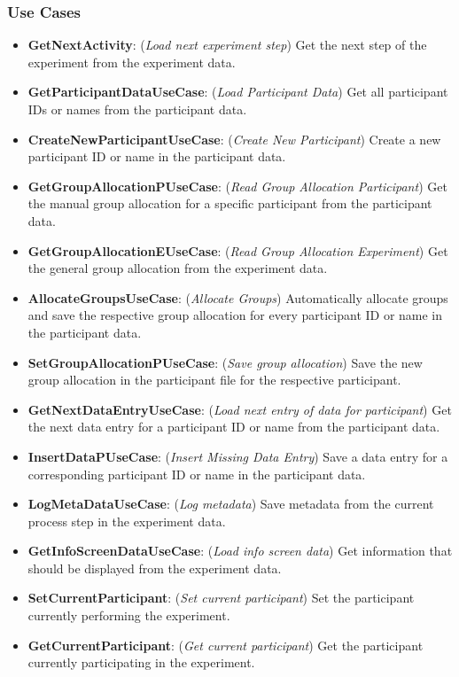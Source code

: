 \begin{spacing}{0.5}

\subsubsection*{Use Cases}
\begin{itemize}
    \item \textbf{GetNextActivity}: (\textit{Load next experiment step}) Get the next step of the experiment from the experiment data.
    \item \textbf{GetParticipantDataUseCase}: (\textit{Load Participant Data}) Get all participant IDs or names from the participant data. 
    \item \textbf{CreateNewParticipantUseCase}: (\textit{Create New Participant}) Create a new participant ID or name in the participant data.
    \item \textbf{GetGroupAllocationPUseCase}: (\textit{Read Group Allocation Participant}) Get the manual group allocation for a specific participant from the participant data.
    \item \textbf{GetGroupAllocationEUseCase}: (\textit{Read Group Allocation Experiment}) Get the general group allocation from the experiment data.
    \item \textbf{AllocateGroupsUseCase}: (\textit{Allocate Groups}) Automatically allocate groups and save the respective group allocation for every participant ID or name in the participant data. 
    \item \textbf{SetGroupAllocationPUseCase}: (\textit{Save group allocation}) Save the new group allocation in the participant file for the respective participant.
    \item \textbf{GetNextDataEntryUseCase}: (\textit{Load next entry of data for participant}) Get the next data entry for a participant ID or name from the participant data. 
    \item \textbf{InsertDataPUseCase}: (\textit{Insert Missing Data Entry}) Save a data entry for a corresponding participant ID or name in the participant data.
    \item \textbf{LogMetaDataUseCase}: (\textit{Log metadata}) Save metadata from the current process step in the experiment data.
    \item \textbf{GetInfoScreenDataUseCase}: (\textit{Load info screen data}) Get information that should be displayed from the experiment data.  
    \item \textbf{SetCurrentParticipant}: (\textit{Set current participant}) Set the participant currently performing the experiment.  
    \item \textbf{GetCurrentParticipant}: (\textit{Get current participant}) Get the participant currently participating in the experiment.  
\end{itemize}

\end{spacing}
